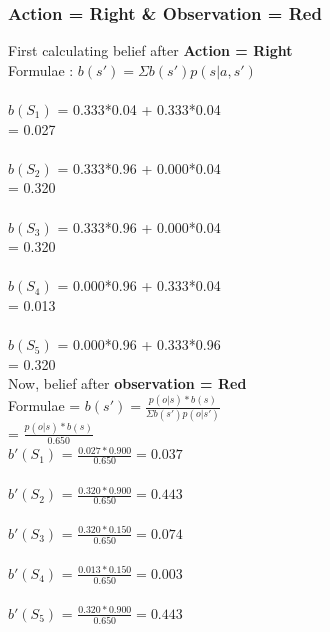 \documentclass[10pt,letterpaper]{article}
\begin{document}
\subsubsection*{Action = Right \& Observation = Red}
First calculating belief after \textbf{Action = Right}\\
Formulae : $b(s') = \Sigma b(s')p(s|a,s')$\\\\
$b(S_1)$ =  0.333*0.04 + 0.333*0.04
\\ \hspace*{23pt} = 0.027\\\\
$b(S_2)$ =  0.333*0.96 + 0.000*0.04
\\ \hspace*{23pt} = 0.320\\\\
$b(S_3)$ =  0.333*0.96 + 0.000*0.04 
\\ \hspace*{23pt} = 0.320\\\\
$b(S_4)$ = 0.000*0.96 + 0.333*0.04 
\\ \hspace*{23pt} = 0.013\\\\
$b(S_5)$ =  0.000*0.96 + 0.333*0.96 
\\ \hspace*{23pt} = 0.320\\

\noindent Now, belief after \textbf{observation = Red}\\
Formulae = $b(s') = \frac{p(o|s)*b(s)}{\Sigma b(s')p(o|s')}$\\
\hspace*{74pt} = $\frac{p(o|s)*b(s)}{0.650}$\\

\noindent$b'(S_1)$ = $\frac{0.027*0.900}{0.650} = 0.037$\\\\
$b'(S_2)$ = $\frac{0.320*0.900}{0.650} = 0.443$\\\\
$b'(S_3)$ = $\frac{0.320*0.150}{0.650} = 0.074$\\\\
$b'(S_4)$ = $\frac{0.013*0.150}{0.650} = 0.003$\\\\
$b'(S_5)$ = $\frac{0.320*0.900}{0.650} = 0.443$\\\\
\end{document}
